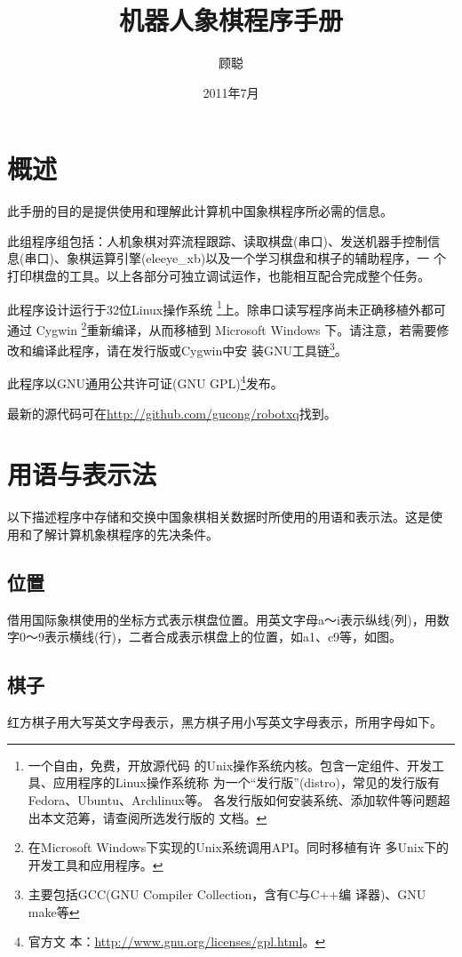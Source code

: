 \documentclass[a4paper]{article}
\title{机器人象棋程序手册}
\author{顾聪}
\date{2011年7月}
\begin{document}
\maketitle
\tableofcontents


\section{概述}
此手册的目的是提供使用和理解此计算机中国象棋程序所必需的信息。

此组程序组包括：人机象棋对弈流程跟踪、读取棋盘(串口)、发送机器手控制信
息(串口)、象棋运算引擎(eleeye\_xb)以及一个学习棋盘和棋子的辅助程序，一
个打印棋盘的工具。以上各部分可独立调试运作，也能相互配合完成整个任务。

此程序设计运行于32位Linux操作系统 \footnote{一个自由，免费，开放源代码
  的Unix操作系统内核。包含一定组件、开发工具、应用程序的Linux操作系统称
  为一个``发行版''(distro)，常见的发行版有Fedora、Ubuntu、Archlinux等。
  各发行版如何安装系统、添加软件等问题超出本文范筹，请查阅所选发行版的
  文档。}上。除串口读写程序尚未正确移植外都可通过 Cygwin
\footnote{在Microsoft Windows下实现的Unix系统调用API。同时移植有许
  多Unix下的开发工具和应用程序。}重新编译，从而移植到 Microsoft
Windows 下。请注意，若需要修改和编译此程序，请在发行版或Cygwin中安
装GNU工具链\footnote{主要包括GCC(GNU Compiler Collection，含有C与C++编
  译器)、GNU make等}。

此程序以GNU通用公共许可证(GNU GPL)\footnote{官方文
  本：\url{http://www.gnu.org/licenses/gpl.html}。}发布。

最新的源代码可在\url{http://github.com/gucong/robotxq}找到。

\section{用语与表示法}
以下描述程序中存储和交换中国象棋相关数据时所使用的用语和表示法。这是使
用和了解计算机象棋程序的先决条件。

\subsection{位置}
借用国际象棋使用的坐标方式表示棋盘位置。用英文字母a～i表示纵线(列)，用数
字0～9表示横线(行)，二者合成表示棋盘上的位置，如a1、c9等，如图。

\smallboard
\begin{position}
\end{position}

\subsection{棋子}
红方棋子用大写英文字母表示，黑方棋子用小写英文字母表示，所用字母如下。
\end{document}
